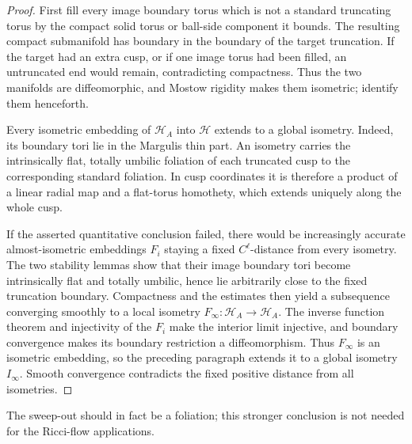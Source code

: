 \begin{proof}
\sketch
First fill every image boundary torus which is not a standard truncating torus
by the compact solid torus or ball-side component it bounds.  The resulting
compact submanifold has boundary in the boundary of the target truncation.  If
the target had an extra cusp, or if one image torus had been filled, an
untruncated end would remain, contradicting compactness.  Thus the two
manifolds are diffeomorphic, and Mostow rigidity makes them isometric; identify
them henceforth.

Every isometric embedding of \(\mathcal H_A\) into \(\mathcal H\) extends to a
global isometry.  Indeed, its boundary tori lie in the Margulis thin part.
An isometry carries the intrinsically flat, totally umbilic foliation of each
truncated cusp to the corresponding standard foliation.  In cusp coordinates
it is therefore a product of a linear radial map and a flat-torus homothety,
which extends uniquely along the whole cusp.

If the asserted quantitative conclusion failed, there would be increasingly
accurate almost-isometric embeddings \(F_i\) staying a fixed \(C^\ell\)-distance
from every isometry.  The two stability lemmas show that their image boundary
tori become intrinsically flat and totally umbilic, hence lie arbitrarily close
to the fixed truncation boundary.  Compactness and the estimates then yield a
subsequence converging smoothly to a local isometry
\(F_\infty:\mathcal H_A\to\mathcal H_A\).  The inverse function theorem and
injectivity of the \(F_i\) make the interior limit injective, and boundary
convergence makes its boundary restriction a diffeomorphism.  Thus
\(F_\infty\) is an isometric embedding, so the preceding paragraph extends it
to a global isometry \(I_\infty\).  Smooth convergence contradicts the fixed
positive distance from all isometries.
\end{proof}

\begin{remark}
\label{rem:chow-iv-cmc-sweepout-foliation-question}
The sweep-out should in fact be a foliation; this stronger conclusion is not
needed for the Ricci-flow applications.
\end{remark}
